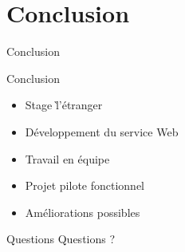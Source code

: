 \section{Conclusion}

\begin{frame}{Conclusion}
	\begin{block}{Conclusion}
		\begin{itemize}
			\item Stage \` l'\'etranger
			\item D\'eveloppement du service Web 
			\item Travail en \'equipe
			\item Projet pilote fonctionnel
			\item Am\'eliorations possibles

		\end{itemize}

	\end{block}

\end{frame}


\begin{frame}{Questions}
	\centering
	{\Large Questions ?}

\end{frame}